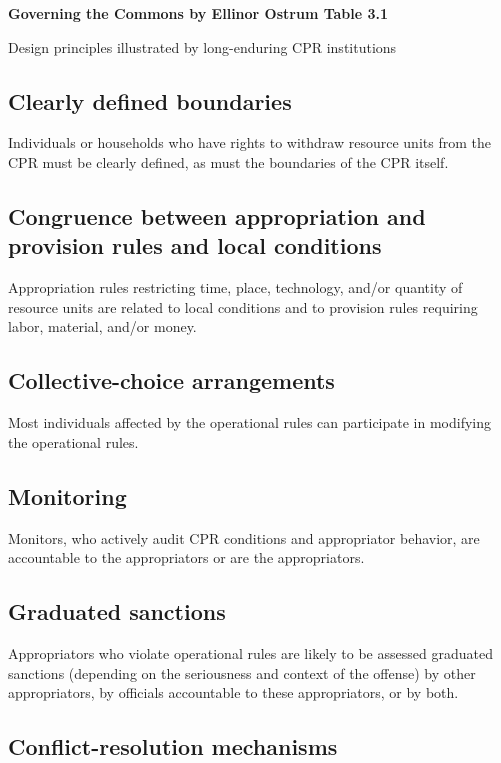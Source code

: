 \documentclass{article}
\begin{document}
\textbf{Governing the Commons by Ellinor Ostrum Table 3.1}


Design principles illustrated by long-enduring CPR institutions

\subsection{Clearly defined boundaries}

Individuals or households who have rights to withdraw resource units from the CPR must be clearly defined, as must the boundaries of the CPR itself.

\subsection{ Congruence between appropriation and provision rules and local conditions}

 Appropriation rules restricting time, place, technology, and/or quantity of resource units are related to local conditions and to provision rules requiring labor, material, and/or money.

\subsection{Collective-choice arrangements}

Most individuals affected by the operational rules can participate in modifying the operational rules.

\subsection{Monitoring}

Monitors, who actively audit CPR conditions and appropriator behavior, are accountable to the appropriators or are the appropriators.

\subsection{Graduated sanctions}

Appropriators who violate operational rules are likely to be assessed graduated sanctions (depending on the seriousness and context of the offense) by other appropriators, by officials accountable to these appropriators, or by both.

\subsection{Conflict-resolution mechanisms}
\end{document}
